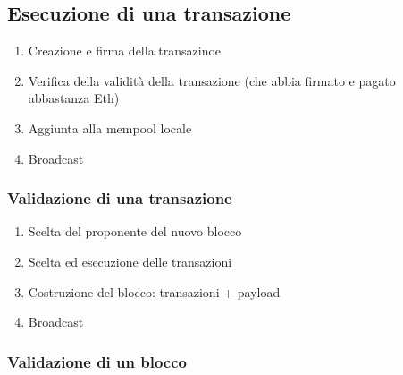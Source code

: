 \documentclass[a4paper]{article}
\begin{document}
\subsection{Esecuzione di una transazione}

\begin{enumerate}
    \item Creazione e firma della transazinoe
    \item Verifica della validità della transazione (che abbia firmato e pagato abbastanza Eth)
    \item Aggiunta alla mempool locale
    \item Broadcast
\end{enumerate}

\subsubsection{Validazione di una transazione}

\begin{enumerate}
    \item Scelta del proponente del nuovo blocco
    \item Scelta ed esecuzione delle transazioni
    \item Costruzione del blocco: transazioni + payload
    \item Broadcast 
\end{enumerate}

\subsubsection{Validazione di un blocco}
\end{document}
